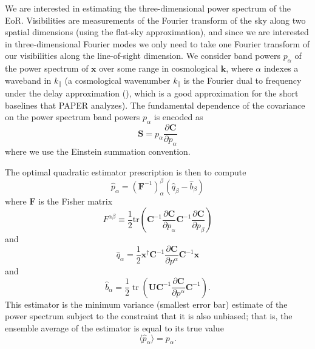 \documentclass[preprint2,numberedappendix,tighten]{aastex6}  %
\newcommand{\C}{\mathbf{C}}
\newcommand{\F}{\mathbf{F}}
\newcommand{\invC}{\ensuremath{\C^{-1}}}
\DeclareMathOperator{\Tr}{tr}
\newcommand{\half}{\ensuremath{\frac{1}{2}}}
\newcommand{\PDeriv}[2]{\ensuremath{\frac{\partial #1}{\partial #2}}}
\begin{document}
We are interested in estimating the three-dimensional power spectrum of the EoR.  
Visibilities are measurements of the Fourier transform of the sky along two spatial dimensions (using the flat-sky approximation), and since we are interested in three-dimensional Fourier modes we only need to take one Fourier transform of our visibilities along the line-of-sight dimension.  We consider band powers $p_\alpha$ of the power spectrum of $\textbf{x}$ over some range in cosmological $\mathbf{k}$, where $\alpha$ indexes a waveband in $k_{\parallel}$ (a cosmological wavenumber $k_{\parallel}$ is the Fourier dual to frequency under the delay approximation (\citealt{parsons_et_al2012b}), which is a good approximation for the short baselines that PAPER analyzes).  The fundamental dependence of the covariance on the power spectrum band powers $p_\alpha$ is encoded as 
\begin{equation}
\textbf{S} = p_{\alpha} \frac{\partial\textbf{C}}{\partial p_{\alpha}}
\end{equation}
where we use the Einstein summation convention.

The optimal quadratic estimator prescription is then to compute
\begin{equation}
\label{eq:OQE}
\widehat{p}_{\alpha}  =  ({\F^{-1}})_\alpha^{\beta} (\widehat{q}_{\beta} - \widehat{b}_{\beta} )
\end{equation}
where $\F$ is the Fisher matrix 
\begin{equation}
F^{\alpha \beta} \equiv \frac{1}{2} \textrm{tr} \left( \C^{-1} \frac{\partial\textbf{C}}{\partial p_{\alpha}} \C^{-1} \frac{\partial\textbf{C}}{\partial p_{\beta}} \right)
\end{equation}
and
\begin{equation}
\label{eq:OQEQuadratic}
\hat{q}_\alpha =  \half \textbf{x}^\dagger \invC \PDeriv{\C}{p^\alpha}  \invC \textbf{x} 
\end{equation}
and
\begin{equation}
\label{eq:OQELinear}
\widehat{b}_{\alpha} = \half \Tr\left( \mathbf{U} \invC \PDeriv{\C}{p^\alpha} \invC \right).
\end{equation}
This estimator is the minimum variance (smallest error bar) estimate of the power spectrum  subject to the constraint that it is also unbiased; that is, the ensemble average of the estimator is equal to its true value
\begin{equation}
\label{eq:super_unbiased}
\langle \widehat{p}_{\alpha} \rangle = p_\alpha.
\end{equation}
\citep{tegmark_et_al1997a,bond_et_al1998}
\end{document}
